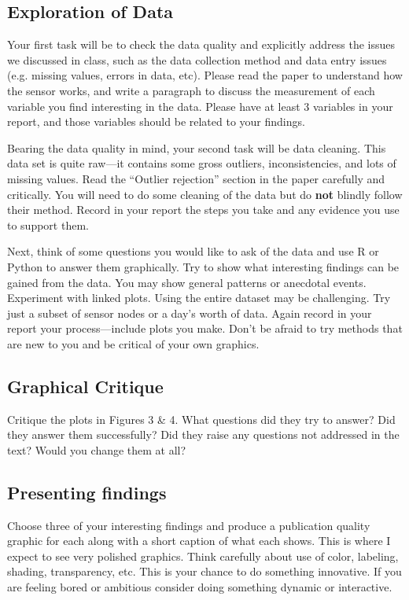 \documentclass[11pt, oneside]{article}   	%
\begin{document}
\subsection*{Exploration of Data}

Your first task will be to check the data quality and explicitly address the
issues we discussed in class, such as the data collection method and data entry
issues (e.g. missing values, errors in data, etc). Please read the paper to
understand how the sensor works, and write a paragraph to discuss the
measurement of each variable you find interesting in the data. Please have at
least 3 variables in your report, and those variables should be related to your
findings.

Bearing the data quality in mind, your second task will be data cleaning. This
data set is quite raw---it contains some gross outliers, inconsistencies, and
lots of missing values. Read the ``Outlier rejection'' section in the paper
carefully and critically.  You will need to do some cleaning of the data but do
\textbf{not} blindly follow their method. Record in your report the steps you
take and any evidence you use to support them.

Next, think of some questions you would like to ask of the data and use R or
Python to answer them graphically. Try to show what interesting findings can be
gained from the data. You may show general patterns or anecdotal events.
Experiment with linked plots. Using the entire dataset may be challenging. Try
just a subset of sensor nodes or a day's worth of data. Again record in your
report your process---include plots you make. Don't be afraid to try methods
that are new to you and be critical of your own graphics.

\subsection*{Graphical Critique}

Critique the plots in Figures 3 \& 4. What questions did they try to answer?
Did they answer them successfully? Did they raise any questions not addressed
in the text? Would you change them at all?

\subsection*{Presenting findings}

Choose three of your interesting findings and produce a publication quality
graphic for each along with a short caption of what each shows. This is where I
expect to see very polished graphics. Think carefully about use of color,
labeling, shading, transparency, etc. This is your chance to do something
innovative. If you are feeling bored or ambitious consider doing something
dynamic or interactive.
\end{document}
